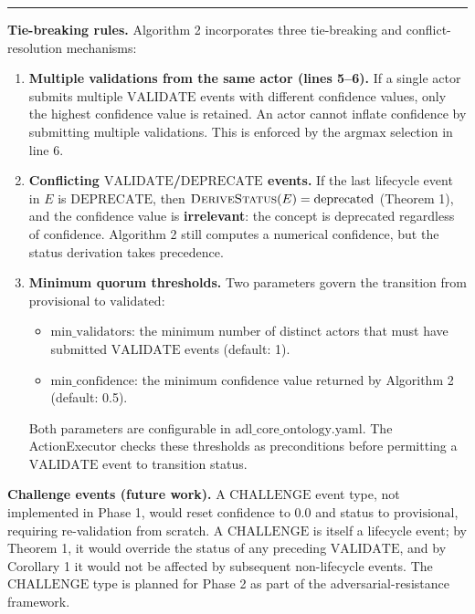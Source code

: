 \begin{center}\rule{0.5\linewidth}{0.5pt}\end{center}

\textbf{Tie-breaking rules.} Algorithm 2 incorporates three tie-breaking and conflict-resolution mechanisms:

\begin{enumerate}
\def\labelenumi{\arabic{enumi}.}
\item
  \textbf{Multiple validations from the same actor (lines 5--6).} If a single actor submits multiple \(\text{VALIDATE}\) events with different confidence values, only the highest confidence value is retained. An actor cannot inflate confidence by submitting multiple validations. This is enforced by the \(\text{argmax}\) selection in line 6.
\item
  \textbf{Conflicting \(\text{VALIDATE}\)/\(\text{DEPRECATE}\) events.} If the last lifecycle event in \(E\) is \(\text{DEPRECATE}\), then \(\textsc{DeriveStatus}(E) = \text{deprecated}\) (Theorem 1), and the confidence value is \textbf{irrelevant}: the concept is deprecated regardless of confidence. Algorithm 2 still computes a numerical confidence, but the status derivation takes precedence.
\item
  \textbf{Minimum quorum thresholds.} Two parameters govern the transition from \(\text{provisional}\) to \(\text{validated}\):

  \begin{itemize}
  \tightlist
  \item
    \(\text{min\_validators}\): the minimum number of distinct actors that must have submitted \(\text{VALIDATE}\) events (default: 1).
  \item
    \(\text{min\_confidence}\): the minimum confidence value returned by Algorithm 2 (default: 0.5).
  \end{itemize}

  Both parameters are configurable in \(\text{adl\_core\_ontology.yaml}\). The ActionExecutor checks these thresholds as preconditions before permitting a \(\text{VALIDATE}\) event to transition status.
\end{enumerate}

\textbf{Challenge events (future work).} A \(\text{CHALLENGE}\) event type, not implemented in Phase 1, would reset confidence to \(0.0\) and status to \(\text{provisional}\), requiring re-validation from scratch. A \(\text{CHALLENGE}\) is itself a lifecycle event; by Theorem 1, it would override the status of any preceding \(\text{VALIDATE}\), and by Corollary 1 it would not be affected by subsequent non-lifecycle events. The \(\text{CHALLENGE}\) type is planned for Phase 2 as part of the adversarial-resistance framework.

